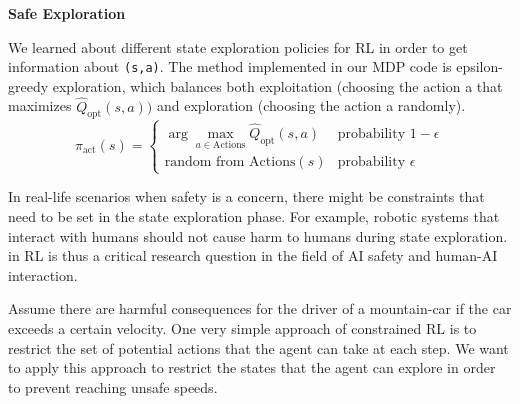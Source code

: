 \item {\bf Safe Exploration}

We learned about different state exploration policies for RL in order to get information about \texttt{(s,a)}. 
The method implemented in our MDP code is epsilon-greedy exploration, which balances both exploitation (choosing the action a that 
maximizes $\hat{Q}_{\text{opt}}(s, a))$ and exploration (choosing the action a randomly).
$$\pi_{\text{act}}(s) = \begin{cases} \arg\max_{a \in \text{Actions}}\hat{Q}_{\text{opt}}(s,a) & \text{probability } 1 - \epsilon \\ 
\text{random from Actions}(s) & \text{probability } \epsilon \end{cases}$$

In real-life scenarios when safety is a concern, there might be constraints that need to be set in the state exploration phase. 
For example, robotic systems that interact with humans should not cause harm to humans during state exploration. 
\cite{fn-2} in RL is thus a critical research question in the field of AI safety 
and human-AI interaction. 

Assume there are harmful consequences for the driver of a mountain-car if the car exceeds a certain velocity. 
One very simple approach of constrained RL is to restrict the set of potential actions that the agent can take at each step. 
We want to apply this approach to restrict the states that the agent can explore in order to prevent reaching unsafe speeds.

\begin{enumerate}

  

  

  

\end{enumerate}
